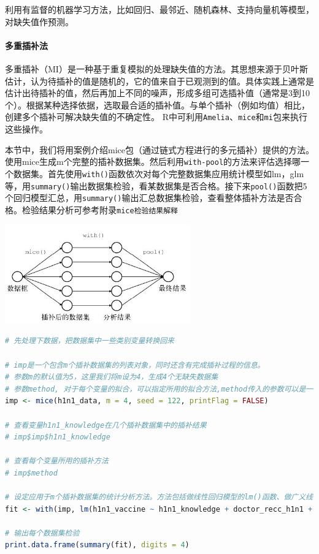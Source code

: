 \documentclass[]{ctexbook}
\let\oldparagraph\paragraph
\renewcommand{\paragraph}[1]{\oldparagraph{#1}\mbox{}}
\newcommand{\passthrough}[1]{#1}
\begin{document}
利用有监督的机器学习方法，比如回归、最邻近、随机森林、支持向量机等模型，对缺失值作预测。

\hypertarget{ux591aux91cdux63d2ux8865ux6cd5}{%
\paragraph{多重插补法}\label{ux591aux91cdux63d2ux8865ux6cd5}}

多重插补（MI）是一种基于重复模拟的处理缺失值的方法。其思想来源于贝叶斯估计，认为待插补的值是随机的，它的值来自于已观测到的值。具体实践上通常是估计出待插补的值，然后再加上不同的噪声，形成多组可选插补值（通常是3到10个）。根据某种选择依据，选取最合适的插补值。与单个插补（例如均值）相比，创建多个插补可解决缺失值的不确定性。 R中可利用\passthrough{\lstinline!Amelia!}、\passthrough{\lstinline!mice!}和\passthrough{\lstinline!mi!}包来执行这些操作。

本节中，我们将用案例介绍mice包（通过链式方程进行的多元插补）提供的方法。使用mice生成m个完整的插补数据集。然后利用\passthrough{\lstinline!with-pool!}的方法来评估选择哪一个数据集。首先使用\passthrough{\lstinline!with()!}函数依次对每个完整数据集应用统计模型如lm，glm等，用\passthrough{\lstinline!summary()!}输出数据集检验，看某数据集是否合格。接下来\passthrough{\lstinline!pool()!}函数把5个回归模型汇总，用\passthrough{\lstinline!summary()!}输出汇总数据集检验，查看整体插补方法是否合格。检验结果分析可参考附录\passthrough{\lstinline!mice检验结果解释!}

\includegraphics[width=0.6\textwidth,height=\textheight]{./image/task02_mice.jpg}

\begin{lstlisting}[language=R]
# 先处理下数据，把数据集中一些类别变量转换回来

# imp是一个包含m个插补数据集的列表对象，同时还含有完成插补过程的信息。
# 参数m的默认值为5，这里我们将m设为4，生成4个无缺失数据集
# 参数method, 对于每个变量的拟合，可以指定所用的拟合方法,method传入的参数可以是一个具体方法，也可以为不同列指定具体方法，具体方法选择可参考附录mice使用文档。这里我们使用默认值。
imp <- mice(h1n1_data, m = 4, seed = 122, printFlag = FALSE)

# 查看变量h1n1_knowledge在几个插补数据集中的插补结果
# imp$imp$h1n1_knowledge

# 查看每个变量所用的插补方法
# imp$method

# 设定应用于m个插补数据集的统计分析方法。方法包括做线性回归模型的lm()函数、做广义线性模型的glm()函数、做广义可加模型的gam()，做负二项模型的nbrm()函数
fit <- with(imp, lm(h1n1_vaccine ~ h1n1_knowledge + doctor_recc_h1n1 + chronic_med_condition + health_insurance + opinion_h1n1_vacc_effective))

# 输出每个数据集检验
print.data.frame(summary(fit), digits = 4)
\end{lstlisting}
\end{document}
